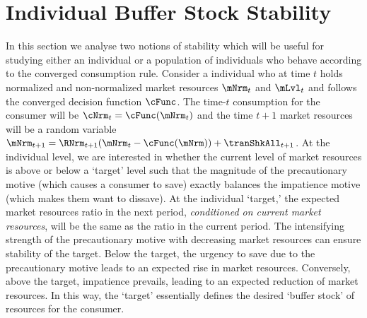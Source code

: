\documentclass[BufferStockTheory]{subfiles}
\begin{document}

\hypertarget{Analysis of the Converged Consumption Function}{}
\section{Individual Buffer Stock Stability}\label{sec:individStability}

In this section we analyse two notions of stability which will be useful for studying either an individual or a population of individuals who behave according to the converged consumption rule.  Consider a individual who at time $t$ holds normalized and non-normalized market resources $\mNrm_{t}$ and $\mLvl_{t}$ and follows the converged decision function $\cFunc$. The time-$t$ consumption for the consumer will be $\cNrm_{t} = \cFunc(\mNrm_{t})$ and the time $t+1$ market resources will be a random variable $\mNrm_{t+1} = \RNrm_{t+1}(\mNrm_{t} - \cFunc(\mNrm)) + \tranShkAll_{t+1}$. At the individual level, we are interested in whether the current level of market resources is above or below a `target' level such that the magnitude of the precautionary motive (which causes a consumer to save) exactly balances the impatience motive  (which makes them want to dissave). At the individual `target,'  the expected market resources ratio in the next period, \textit{conditioned on current market resources}, will be the same as the ratio in the current period.  The intensifying strength of the precautionary motive with decreasing market resources can ensure stability of the target. Below the target, the urgency to save due to the precautionary motive leads to an expected rise in market resources. Conversely, above the target, impatience prevails, leading to an expected reduction of market resources. In this way, the `target' essentially defines the desired `buffer stock' of resources for the consumer.
\end{document}
